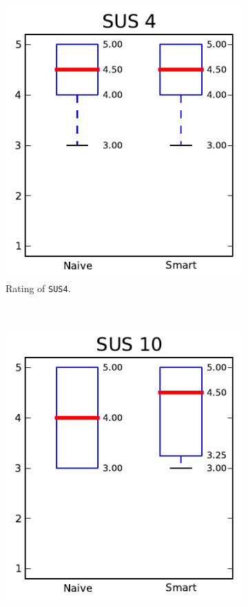 \begin{figure}[h!]
\begin{subfigure}[t]{0.32\textwidth}
\includegraphics[width=\textwidth]{img/graphs/4a_03.pdf}
\caption{Rating of \texttt{SUS4}.}
\end{subfigure}%
~
\begin{subfigure}[t]{0.32\textwidth}
\centering
\includegraphics[width=\textwidth]{img/graphs/4a_09.pdf}

\end{subfigure}
\end{figure}
